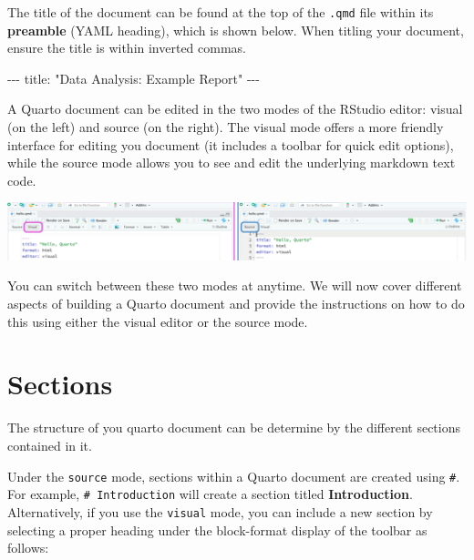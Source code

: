\documentclass[
  letterpaper,
  DIV=11,
  numbers=noendperiod]{scrartcl}
\newenvironment{Shaded}{\begin{snugshade}}{\end{snugshade}}
\newcommand{\NormalTok}[1]{\textcolor[rgb]{0.00,0.23,0.31}{#1}}
\newcommand{\SpecialCharTok}[1]{\textcolor[rgb]{0.37,0.37,0.37}{#1}}
\newcommand{\StringTok}[1]{\textcolor[rgb]{0.13,0.47,0.30}{#1}}
\begin{document}
The title of the document can be found at the top of the \texttt{.qmd}
file within its \textbf{preamble} (YAML heading), which is shown below.
When titling your document, ensure the title is within inverted commas.

\begin{Shaded}
\begin{Highlighting}[]
\SpecialCharTok{{-}{-}{-}}
\NormalTok{title}\SpecialCharTok{:} \StringTok{"Data Analysis: Example Report"}
\SpecialCharTok{{-}{-}{-}}
\end{Highlighting}
\end{Shaded}

A Quarto document can be edited in the two modes of the RStudio editor:
visual (on the left) and source (on the right). The visual mode offers a
more friendly interface for editing you document (it includes a toolbar
for quick edit options), while the source mode allows you to see and
edit the underlying markdown text code.

\begin{center}
\includegraphics[width=7.94792in,height=\textheight]{images/quarto2.png}
\end{center}

You can switch between these two modes at anytime. We will now cover
different aspects of building a Quarto document and provide the
instructions on how to do this using either the visual editor or the
source mode.

\section{Sections}\label{sec-sections}

The structure of you quarto document can be determine by the different
sections contained in it.

Under the \texttt{source} mode, sections within a Quarto document are
created using \texttt{\#}. For example, \texttt{\#\ Introduction} will
create a section titled \textbf{Introduction}. Alternatively, if you use
the \texttt{visual} mode, you can include a new section by selecting a
proper heading under the block-format display of the toolbar as follows:
\end{document}
